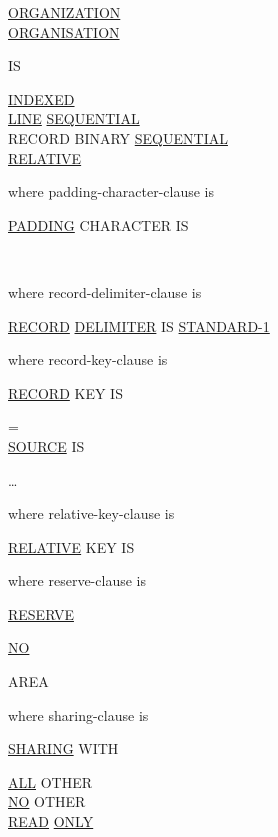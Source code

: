 \documentclass[a4paper,oneside,svgnames]{scrbook}
\makeatletter
\newcommand{\key}[1]{\underline{#1}}
\newcommand{\xopen}[1]{%
  \colorbox{green!75}{#1}}
\newcommand{\miscext}[1]{%
  \colorbox{blue!50}{#1}}
\newcommand{\pending}[1]{%
  \textcolor{gray!75}{#1}}
\newenvironment{0-1}{$\left[ \begin{tabular}{@{}l@{}}}{\end{tabular} \right]$}
\newenvironment{1=}{$\left\{ \begin{tabular}{@{}l@{}}}{\end{tabular} \right\}$}
\makeatother
\begin{document}
\begin{0-1}
  \begin{1=}
    \key{ORGANIZATION} \\
    \miscext{\key{ORGANISATION}}
  \end{1=}
  IS
\end{0-1}
\begin{1=}
  \key{INDEXED} \\
  \xopen{\key{LINE} \key{SEQUENTIAL}} \\
  \miscext{RECORD BINARY} \key{SEQUENTIAL} \\
  \key{RELATIVE}
\end{1=}

where padding-character-clause is

\pending{
  \key{PADDING} CHARACTER IS
  \begin{1=}
    \identifier \\
    \literal
  \end{1=}
}

where record-delimiter-clause is

\pending{\key{RECORD} \key{DELIMITER} IS \key{STANDARD-1}}

where record-key-clause is

\key{RECORD} KEY IS \identifier
\begin{0-1}
  \begin{1=}
    = \\
    \key{SOURCE} IS
  \end{1=}
  \begin{1=}
    \identifier
  \end{1=}\ldots
\end{0-1}

where relative-key-clause is

\key{RELATIVE} KEY IS \identifier

where reserve-clause is

\pending{
  \key{RESERVE}
  \begin{1=}
    \key{NO} \\
    \integer
  \end{1=}
  AREA
}

where sharing-clause is

\key{SHARING} WITH
\begin{1=}
  \key{ALL} OTHER \\
  \key{NO} OTHER \\
  \key{READ} \key{ONLY}
\end{1=}
\end{document}
